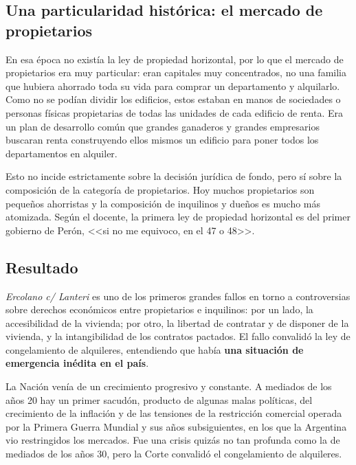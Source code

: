 \documentclass[12pt,oneside]{book}
\begin{document}
\subsection{Una particularidad histórica: el mercado de propietarios}

En esa época no existía la ley de propiedad horizontal, por lo que el mercado de propietarios era muy particular: eran capitales muy concentrados, no una familia que hubiera ahorrado toda su vida para comprar un departamento y alquilarlo. Como no se podían dividir los edificios, estos estaban en manos de sociedades o personas físicas propietarias de todas las unidades de cada edificio de renta. Era un plan de desarrollo común que grandes ganaderos y grandes empresarios buscaran renta construyendo ellos mismos un edificio para poner todos los departamentos en alquiler.

Esto no incide estrictamente sobre la decisión jurídica de fondo, pero sí sobre la composición de la categoría de propietarios. Hoy muchos propietarios son pequeños ahorristas y la composición de inquilinos y dueños es mucho más atomizada. Según el docente, la primera ley de propiedad horizontal es del primer gobierno de Perón, <<si no me equivoco, en el 47 o 48>>.


\subsection{Resultado}

\textit{Ercolano c/ Lanteri} es uno de los primeros grandes fallos en torno a controversias sobre derechos económicos entre propietarios e inquilinos: por un lado, la accesibilidad de la vivienda; por otro, la libertad de contratar y de disponer de la vivienda, y la intangibilidad de los contratos pactados. El fallo convalidó la ley de congelamiento de alquileres, entendiendo que había \textbf{una situación de emergencia inédita en el país}.

La Nación venía de un crecimiento progresivo y constante. A mediados de los años 20 hay un primer sacudón, producto de algunas malas políticas, del crecimiento de la inflación y de las tensiones de la restricción comercial operada por la Primera Guerra Mundial y sus años subsiguientes, en los que la Argentina vio restringidos los mercados. Fue una crisis quizás no tan profunda como la de mediados de los años 30, pero la Corte convalidó el congelamiento de alquileres.
\end{document}
